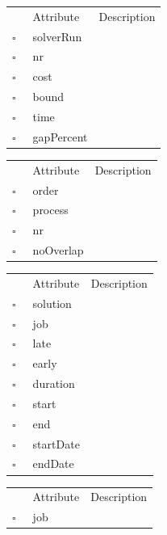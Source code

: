 \begin{table}
\caption{IntermediateSolution  }

\begin{longtable}{llp{8cm}}
& Attribute & Description \\
$\square$\ & solverRun &  \\
$\square$\ & nr &  \\
$\square$\ & cost &  \\
$\square$\ & bound &  \\
$\square$\ & time &  \\
$\square$\ & gapPercent &  \\
\end{longtable}
\label{attr:IntermediateSolution}
\end{table}

\begin{table}
\caption{Job  }

\begin{longtable}{llp{8cm}}
& Attribute & Description \\
$\square$\ & order &  \\
$\square$\ & process &  \\
$\square$\ & nr &  \\
$\square$\ & noOverlap &  \\
\end{longtable}
\label{attr:Job}
\end{table}

\clearpage
\begin{table}
\caption{JobAssignment  }

\begin{longtable}{llp{8cm}}
& Attribute & Description \\
$\square$\ & solution &  \\
$\square$\ & job &  \\
$\square$\ & late &  \\
$\square$\ & early &  \\
$\square$\ & duration &  \\
$\square$\ & start &  \\
$\square$\ & end &  \\
$\square$\ & startDate &  \\
$\square$\ & endDate &  \\
\end{longtable}
\label{attr:JobAssignment}
\end{table}

\begin{table}
\caption{JobLowerBound  }

\begin{longtable}{llp{8cm}}
& Attribute & Description \\
$\square$\ & job &  \\
\end{longtable}
\label{attr:JobLowerBound}
\end{table}

